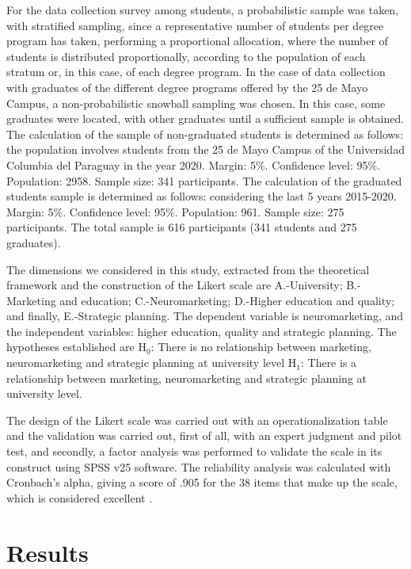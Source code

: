 \documentclass[english]{textolivre}
\begin{document}
For the data collection survey among students, a probabilistic sample was taken, with stratified sampling, since a representative number of students per degree program has taken, performing a proportional allocation, where the number of students is distributed proportionally, according to the population of each stratum or, in this case, of each degree program. In the case of data collection with graduates of the different degree programs offered by the 25 de Mayo Campus, a non-probabilistic snowball sampling was chosen. In this case, some graduates were located, with other graduates until a sufficient sample is obtained. The calculation of the sample of non-graduated students is determined as follows: the population involves students from the 25 de Mayo Campus of the Universidad Columbia del Paraguay in the year 2020. Margin: 5\%. Confidence level: 95\%. Population: 2958. Sample size: 341 participants. The calculation of the graduated students sample is determined as follows: considering the last 5 years 2015-2020. Margin: 5\%. Confidence level: 95\%. Population: 961. Sample size: 275 participants. The total sample is 616 participants (341 students and 275 graduates).

The dimensions we considered in this study, extracted from the theoretical framework and the construction of the Likert scale are A.-University; B.-Marketing and education; C.-Neuromarketing; D.-Higher education and quality; and finally, E.-Strategic planning. The dependent variable is neuromarketing, and the independent variables: higher education, quality and strategic planning. The hypotheses established are H$_0$: There is no relationship between marketing, neuromarketing and strategic planning at university level H$_1$: There is a relationship between marketing, neuromarketing and strategic planning at university level.

The design of the Likert scale was carried out with an operationalization table and the validation was carried out, first of all, with an expert judgment and pilot test, and secondly, a factor analysis was performed to validate the scale in its construct using SPSS v25 software. The reliability analysis was calculated with Cronbach's alpha, giving a score of .905 for the 38 items that make up the scale, which is considered excellent \cite{george_spss_2003}.

\section{Results}
\end{document}
